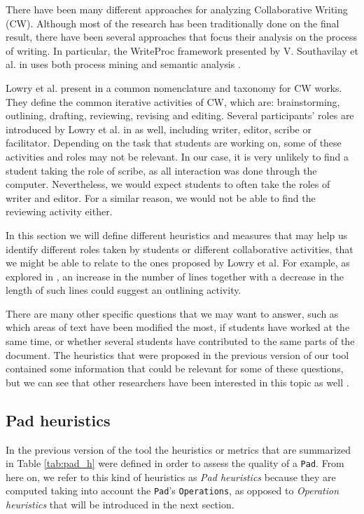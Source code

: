     There have been many different approaches for analyzing Collaborative Writing (CW). Although most of the research has been traditionally done on the final result, there have been several approaches that focus their analysis on the process of writing. In particular, the WriteProc framework presented by V. Southavilay et al. in uses both process mining and semantic analysis \cite{southavilay2009writeproc}.
    
    Lowry et al. present in \cite{lowry2004building} a common nomenclature and taxonomy for CW works. They define the common iterative activities of CW, which are: brainstorming, outlining, drafting, reviewing, revising and editing. Several participants' roles are introduced by Lowry et al. in \cite{lowry2004building} as well, including writer, editor, scribe or facilitator. Depending on the task that students are working on, some of these activities and roles may not be relevant. In our case, it is very unlikely to find a student taking the role of scribe, as all interaction was done through the computer. Nevertheless, we would expect students to often take the roles of writer and editor. For a similar reason, we would not be able to find the reviewing activity either.
    
    In this section we will define different heuristics and measures that may help us identify different roles taken by students or different collaborative activities, that we might be able to relate to the ones proposed by Lowry et al. For example, as explored in \cite{sv2}, an increase in the number of lines together with a decrease in the length of such lines could suggest an outlining activity.
    
    There are many other specific questions that we may want to answer, such as which areas of text have been modified the most, if students have worked at the same time, or whether several students have contributed to the same parts of the document. The heuristics that were proposed in the previous version of our tool \cite{FROG-analytics} contained some information that could be relevant for some of these questions, but we can see that other researchers have been interested in this topic as well \cite{sv3}.

\subsection{Pad heuristics}
\label{sub:Pad_heuristics}
    In the previous version of the tool \cite{FROG-analytics} the heuristics or metrics that are summarized in Table \ref{tab:pad_h} were defined in order to assess the quality of a \texttt{Pad}. From here on, we refer to this kind of heuristics as \textit{Pad heuristics} because they are computed taking into account the \texttt{Pad}'s \texttt{Operations}, as opposed to \textit{Operation heuristics} that will be introduced in the next section.
    
